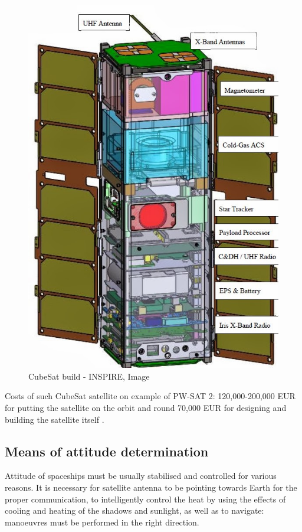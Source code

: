\documentclass[12pt,a4paper,oneside]{article}
\begin{document}
\begin{figure}[!htbp]
\includegraphics[scale=0.45]{INSPIRE_JPL.jpg}
\centering
\caption{CubeSat build - INSPIRE, Image \cite{cubesat-build}}
\label{fig:cubesat-build}
\end{figure}

Costs of such CubeSat satellite on example of PW-SAT 2: 120,000-200,000 EUR for putting the satellite on the orbit and round 70,000 EUR for designing and building the satellite itself \cite{pw-pw-sat2}.


\subsection{Means of attitude determination}

Attitude of spaceships must be usually stabilised and controlled for various reasons.
It is necessary for satellite antenna to be pointing towards Earth for the proper communication, to intelligently control the heat by using the effects of cooling and heating of the shadows and sunlight, as well as to navigate: manoeuvres must be performed in the right direction.
\end{document}

